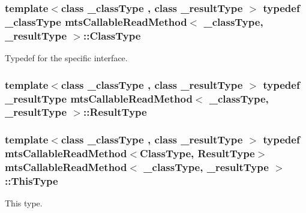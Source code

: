 \hypertarget{classmts_callable_read_method_a44650138085a29d60a4f3cb3616abbbf}{
\subsubsection[{Class\-Type}]{\setlength{\rightskip}{0pt plus 5cm}template$<$class \-\_\-class\-Type , class \-\_\-result\-Type $>$ typedef \-\_\-class\-Type {\bf mts\-Callable\-Read\-Method}$<$ \-\_\-class\-Type, \-\_\-result\-Type $>$\-::{\bf Class\-Type}}}\label{classmts_callable_read_method_a44650138085a29d60a4f3cb3616abbbf}
Typedef for the specific interface. \hypertarget{classmts_callable_read_method_ae1add51b4fb434797e00a79fe31aa7de}{
\subsubsection[{Result\-Type}]{\setlength{\rightskip}{0pt plus 5cm}template$<$class \-\_\-class\-Type , class \-\_\-result\-Type $>$ typedef \-\_\-result\-Type {\bf mts\-Callable\-Read\-Method}$<$ \-\_\-class\-Type, \-\_\-result\-Type $>$\-::{\bf Result\-Type}}}\label{classmts_callable_read_method_ae1add51b4fb434797e00a79fe31aa7de}
\hypertarget{classmts_callable_read_method_af176b353a29900c0d650356c559c4cdd}{
\subsubsection[{This\-Type}]{\setlength{\rightskip}{0pt plus 5cm}template$<$class \-\_\-class\-Type , class \-\_\-result\-Type $>$ typedef {\bf mts\-Callable\-Read\-Method}$<${\bf Class\-Type}, {\bf Result\-Type}$>$ {\bf mts\-Callable\-Read\-Method}$<$ \-\_\-class\-Type, \-\_\-result\-Type $>$\-::{\bf This\-Type}}}\label{classmts_callable_read_method_af176b353a29900c0d650356c559c4cdd}
This type. 

